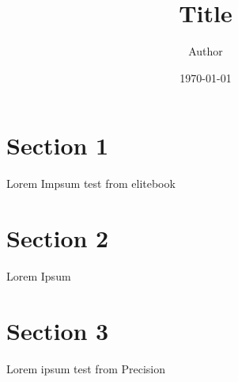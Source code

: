 \documentclass[11pt]{article}
\title{ Title}
\author{ Author }
\date{\today}
\begin{document}
\maketitle	
\pagebreak

\tableofcontents
\pagebreak


\section{Section 1}

Lorem Impsum test from elitebook


\pagebreak
\section{Section 2}
Lorem Ipsum \\

\pagebreak
\section{Section 3}

Lorem ipsum test from Precision

\end{document}
